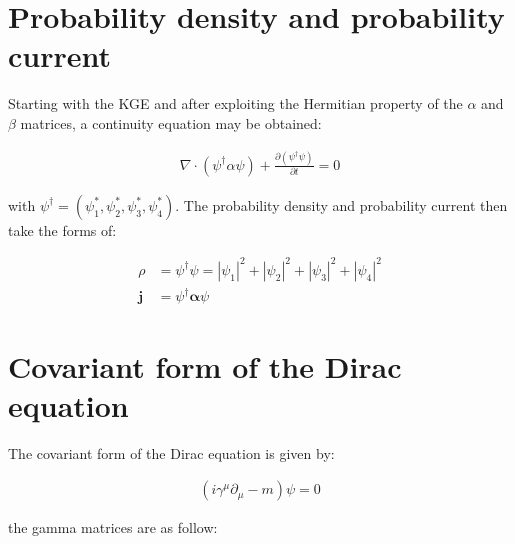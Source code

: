\documentclass[10pt]{article}
\theoremstyle{definition}
\begin{document}
\section*{Probability density and probability current }%

Starting with the KGE and after exploiting the Hermitian property of the $\alpha$ and $\beta$ matrices, a continuity equation may be obtained:

\begin{align}
    \nabla \cdot (\psi^{\dagger}\alpha\psi) + \frac{\partial (\psi^{\dagger}\psi)}{\partial t} = 0
\end{align}

with $\psi^{\dagger} = (\psi_1^*,\psi_2^*,\psi_3^*,\psi_4^*)$. The probability density and probability current then take the forms of:

\begin{align*}
    \rho &= \psi^{\dagger}\psi = |\psi_1|^2 +|\psi_2|^2 +|\psi_3|^2 +|\psi_4|^2 \\
    \mathbf{j} &= \psi^{\dagger}\mathbf{\alpha}\psi
\end{align*}

\section*{Covariant form of the Dirac equation}%

The covariant form of the Dirac equation is given by:

\begin{align}
    (i\gamma^{\mu}\partial_{\mu} - m)\psi = 0
\end{align}

the gamma matrices are as follow:
\end{document}
